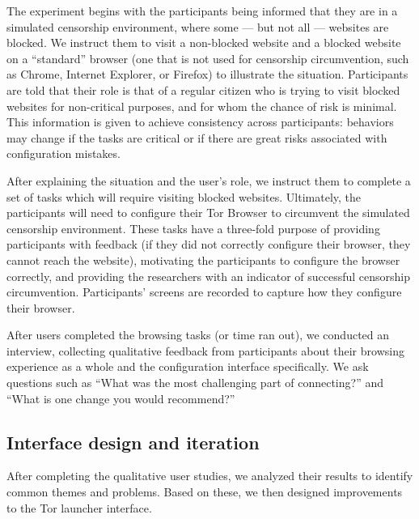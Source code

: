 \documentclass{template}
\begin{document}

The experiment begins with the participants being informed that they are in a
simulated censorship
environment, where some --- but not all --- websites are blocked. We
instruct them to visit a non-blocked website and a blocked website on a
``standard'' browser (one that is not used for censorship circumvention, such
as Chrome, Internet Explorer, or Firefox) to illustrate the situation.
Participants are told that their
role is that of a regular citizen who is trying to visit blocked websites
for non-critical purposes,
and for whom the chance of risk is minimal. This information is given
to achieve
consistency across participants: behaviors may change if the tasks are
critical or if there are great risks associated with configuration mistakes.

After explaining the situation and the user's role, we
instruct them to complete a set of
tasks which will require visiting blocked websites. Ultimately, the
participants will need to configure their Tor Browser to circumvent the
simulated censorship environment. These tasks have a three-fold purpose of
providing participants with feedback (if they did not correctly configure their
browser, they cannot reach the website), motivating the participants to
configure the browser correctly, and providing the researchers with an
indicator of successful censorship circumvention.
Participants' screens are recorded to capture how they configure
their browser.

After users completed the browsing tasks (or time ran out), we conducted an
interview, collecting qualitative feedback from
participants about their browsing experience as a whole
and the configuration interface specifically.
We ask questions such as
``What was the most challenging part of connecting?''
and
``What is one change you would recommend?''


\subsection{Interface design and iteration}
After completing the qualitative user studies, we analyzed their results to
identify common themes and problems. Based on these, we then designed
improvements to the Tor launcher interface.
\end{document}
